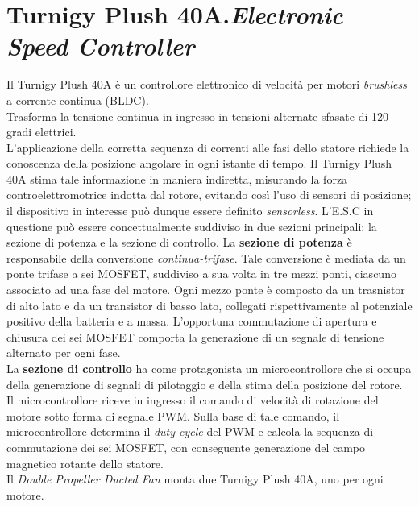 \section{Turnigy Plush 40A.\@ \textit{Electronic Speed Controller}}
Il Turnigy Plush 40A è un controllore elettronico di velocità per motori \textit{brushless} a corrente continua (BLDC).\\
Trasforma la tensione continua in ingresso in tensioni alternate sfasate di 120 gradi elettrici.\\
L'applicazione della corretta sequenza di correnti alle fasi dello statore richiede la conoscenza della posizione angolare in ogni istante di tempo. Il Turnigy Plush 40A stima tale informazione in maniera indiretta, misurando la forza controelettromotrice indotta dal rotore, evitando così l'uso di sensori di posizione; il dispositivo in interesse può dunque essere definito \textit{sensorless}.
L'E.S.C in questione può essere concettualmente suddiviso in due sezioni principali: la sezione di potenza e la sezione di controllo.
La \textbf{sezione di potenza} è responsabile della conversione \textit{continua-trifase}. Tale conversione è mediata da un ponte trifase a sei MOSFET, suddiviso a sua volta in tre mezzi ponti, ciascuno associato ad una fase del motore.
Ogni mezzo ponte è composto da un trasnistor di alto lato e da un transistor di basso lato, collegati rispettivamente al potenziale positivo della batteria e a massa. L'opportuna commutazione di apertura e chiusura dei sei MOSFET comporta la generazione di un segnale di tensione alternato per ogni fase.\\
La \textbf{sezione di controllo} ha come protagonista un microcontrollore che si occupa della generazione di segnali di pilotaggio e della stima della posizione del rotore. Il microcontrollore riceve in ingresso il comando di velocità di rotazione del motore sotto forma di segnale PWM.
Sulla base di tale comando, il microcontrollore determina il \textit{duty cycle} del PWM e calcola la sequenza di commutazione dei sei MOSFET, con conseguente generazione del campo magnetico rotante dello statore.\\
Il \textit{Double Propeller Ducted Fan} monta due Turnigy Plush 40A, uno per ogni motore.


